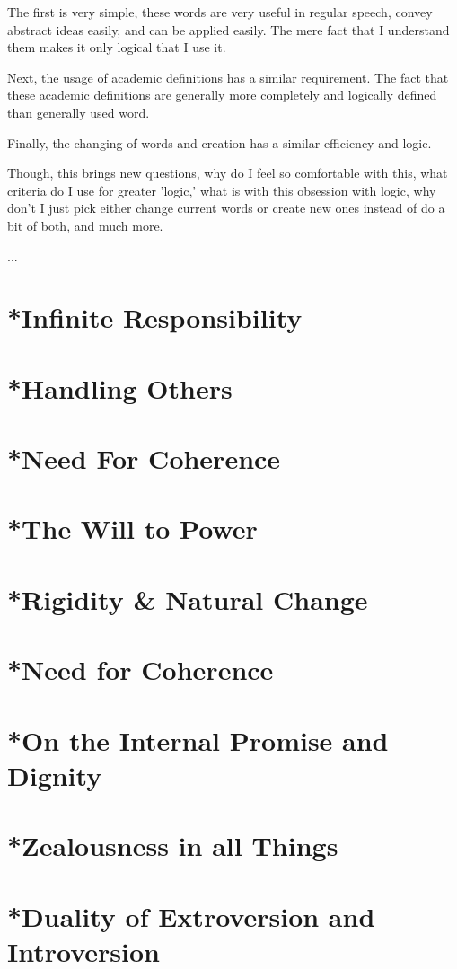 \par The first is very simple, these words are very useful in regular speech, convey abstract ideas easily, and can be applied easily. The mere fact that I understand them makes it only logical that I use it.
\par Next, the usage of academic definitions has a similar requirement. The fact that these academic definitions are generally more completely and logically defined than generally used word. 
\par Finally, the changing of words and creation has a similar efficiency and logic.
\par Though, this brings new questions, why do I feel so comfortable with this, what criteria do I use for greater 'logic,' what is with this obsession with logic, why don't I just pick either change current words or create new ones instead of do a bit of both, and much more.
\par ...
\section{*Infinite Responsibility}
\section{*Handling Others}
\section{*Need For Coherence}

\section{*The Will to Power}
\section{*Rigidity \& Natural Change}
\section{*Need for Coherence}
\section{*On the Internal Promise and Dignity}
\section{*Zealousness in all Things}
\section{*Duality of Extroversion and Introversion}
